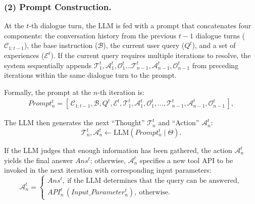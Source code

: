 \documentclass[runningheads]{llncs}
\begin{document}
\subsubsection{(2) Prompt Construction.}\label{sec:prompt_construct}

At the $t$-th dialogue turn, the LLM is fed with a prompt that concatenates four components: the conversation history from the previous $t-1$ dialogue turns ($\mathcal{C}_{1:t-1}$), the base instruction ($\mathcal{B}$), the current user query ($Q^t$), and a set of experiences ($\mathcal{E}^{t}$). 
If the current query requires multiple iterations to resolve, the system sequentially appends $\mathcal{T}^{t}_{1}, \mathcal{A}^{t}_{1}, \mathcal{O}^{t}_{1} \dots \mathcal{T}^{t}_{n-1}, \mathcal{A}^{t}_{n-1}, \mathcal{O}^{t}_{n-1}$ from preceding iterations within the same dialogue turn to the prompt.

Formally, the prompt at the $n$-th iteration is:
\begin{equation}
    \begin{aligned}
        Prompt_{n}^{t} = [\,\mathcal{C}_{1:t-1}, \mathcal{B}, Q^t, \mathcal{E}^{t}, \mathcal{T}^{t}_{1}, \mathcal{A}^{t}_{1}, \mathcal{O}^{t}_{1}, \dots, \mathcal{T}^{t}_{n-1}, \mathcal{A}^{t}_{n-1}, \mathcal{O}^{t}_{n-1}\,],
    \end{aligned}
    \label{eq:er_qtao_prompt}
\end{equation}


The LLM then generates the next ``Thought'' $\mathcal{T}_{n}^{t}$ and ``Action'' $\mathcal{A}_{n}^{t}$:
\begin{equation}
    \mathcal{T}_{n}^{t}, \mathcal{A}_{n}^{t} \gets \text{LLM}(Prompt_{n}^{t} \mid \Theta).
    \label{eq:er_qtao_llm}
\end{equation}


If the LLM judges that enough information has been gathered, the action $\mathcal{A}_{n}^{t}$ yields the final answer $Ans^t$; otherwise, $\mathcal{A}_{n}^{t}$ specifies a new tool API to be invoked in the next iteration with corresponding input parameters:
\begin{equation}
    \mathcal{A}_{n}^{t} = 
    \begin{cases}
        Ans^{t}, \ \text{if the LLM determines that the query can be answered}, \\
        API_{n}^{t}\, (Input\_Parameter_{n}^{t}), \ \text{otherwise}.
    \end{cases}
    \label{eq:er_qtao_action}
\end{equation}
\end{document}
